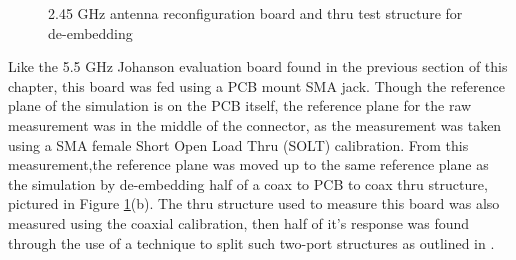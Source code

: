 \documentclass[12pt]{usfcoe}
\begin{document}
    
	\begin{figure}%
	    \hspace{0.03\textwidth}
	    \caption{2.45 GHz antenna reconfiguration board and thru test structure for de-embedding}%
	    \label{fig:irl_antenna_board} %
    \end{figure} 
	
    Like the 5.5 GHz Johanson evaluation board found in the previous section of this chapter, this board was fed using a PCB mount SMA jack.
    Though the reference plane of the simulation is on the PCB itself, the reference plane for the raw measurement was in the middle of the connector, as the measurement was taken using a SMA female Short Open Load Thru (SOLT) calibration. 
    From this measurement,the reference plane was moved up to the same reference plane as the simulation by de-embedding half of a coax to PCB to coax thru structure, pictured in Figure \ref{fig:irl_antenna_board}(b).
    The thru structure used to measure this board was also measured using the coaxial calibration, then half of it's response was found through the use of a technique to split such two-port structures as outlined in \cite{thru_split}.
    
\end{document}
